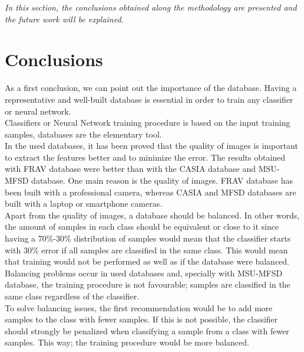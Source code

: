 \begin{small}
\emph{In this section, the conclusions obtained along the methodology are presented and the future work will be explained.}
\end{small}

\section{Conclusions}
As a first conclusion,  we can point out the importance of the database. Having a representative and well-built database is essential in order to train any classifier or neural network.\\

Classifiers or Neural Network training procedure is based on the input training samples, databases are the elementary tool.\\

In the used databases, it has been proved that the quality of images is important to extract the features better and to minimize the error. The results obtained with FRAV database were better than with the CASIA database and MSU-MFSD database. One main reason is the quality of images. FRAV database has been built with a professional camera, whereas CASIA and MFSD databases are built with a laptop or smartphone cameras.\\

Apart from the quality of images, a database should be balanced. In other words, the amount of samples in each class should be equivalent or close to it since having a 70\%-30\%  distribution of samples would mean that the classifier starts with 30\% error if all samples are classified in the same class. This would mean that training would not be performed as well as if the database were balanced.\\

Balancing problems occur in used databases and, specially with MSU-MFSD database, the training procedure is not favourable; samples are classified in the same class regardless of the classifier.\\

To solve balancing issues, the first recommendation would be to add more samples to the class with fewer samples. If this is not possible, the classifier should strongly be penalized when classifying a sample from a class with fewer samples. This way; the training procedure would be more balanced.\\

